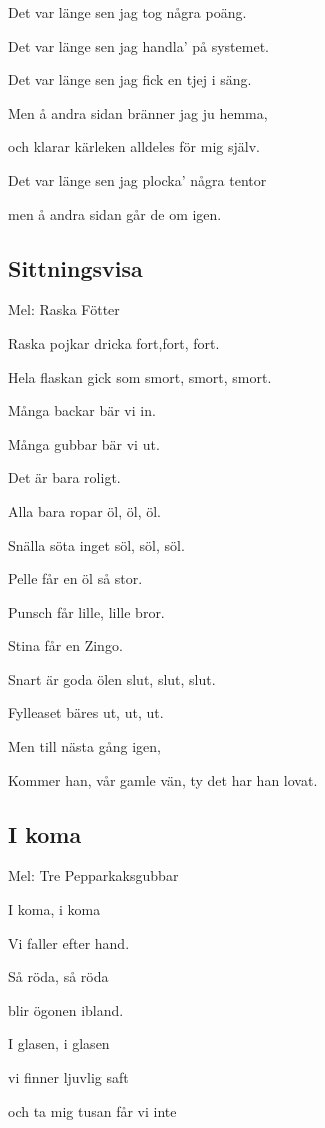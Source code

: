 Det var länge sen jag tog några poäng.

Det var länge sen jag handla’ på systemet.

Det var länge sen jag fick en tjej i säng.\bigskip

Men å andra sidan bränner jag ju hemma,

och klarar kärleken alldeles för mig själv.

Det var länge sen jag plocka’ några tentor

men å andra sidan går de om igen. 

\subsection{\textbf{Sittningsvisa}}

Mel: Raska Fötter\bigskip


Raska pojkar dricka fort,fort, fort.

Hela flaskan gick som smort, smort, smort.

Många backar bär vi in.

Många gubbar bär vi ut.

Det är bara roligt.\bigskip

Alla bara ropar öl, öl, öl.

Snälla söta inget söl, söl, söl.

Pelle får en öl så stor.

Punsch får lille, lille bror.

Stina får en Zingo.\bigskip

Snart är goda ölen slut, slut, slut.

Fylleaset bäres ut, ut, ut.

Men till nästa gång igen,

Kommer han, vår gamle vän, ty det har han lovat.\

\subsection{\textbf{I koma}}

Mel: Tre Pepparkaksgubbar\bigskip

I koma, i koma

Vi faller efter hand.

Så röda, så röda

blir ögonen ibland.

I glasen, i glasen

vi finner ljuvlig saft

och ta mig tusan får vi inte

